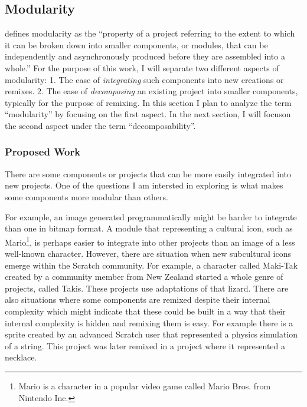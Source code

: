 \subsection{Modularity}
\citet{benkler_coases_2002} defines modularity as the ``property of a project referring to the extent to which it can be broken down into smaller components, or modules, that can be independently and asynchronously produced before they are assembled into a whole.''
For the purpose of this work, I will separate two different aspects of modularity:
1. The ease of \emph{integrating} such components into new creations or remixes.
2. The ease of \emph{decomposing} an existing project into smaller components, typically for the purpose of remixing.
In this section I plan to analyze the term ``modularity'' by focusing on the first aspect.
In the next section, I will focuson the second aspect under the term ``decomposability''.

\subsubsection{Proposed Work}
There are some components or projects that can be more easily integrated into new projects. 
One of the questions I am intersted in exploring is what makes some components more modular than others.

For example, an image generated programmatically might be harder to integrate than one in bitmap format. 
A module that representing a cultural icon, such as Mario\footnote{Mario is a character in a popular video game called Mario Bros. from Nintendo Inc.}, is perhaps easier to integrate into other projects than an image of a less well-known character.
However, there are situation when new subcultural icons emerge within the Scratch community.
For example, a character called Maki-Tak created by a community member from New Zealand started a whole genre of projects, called Takis.
These projects use adaptations of that lizard. 
There are also situations where some components are remixed despite their internal complexity which might indicate that these could be built in a way that their internal complexity is hidden and remixing them is easy. 
For example there is a sprite created by an advanced Scratch user that represented a physics simulation of a string. 
This project was later remixed in a project where it represented a necklace.

